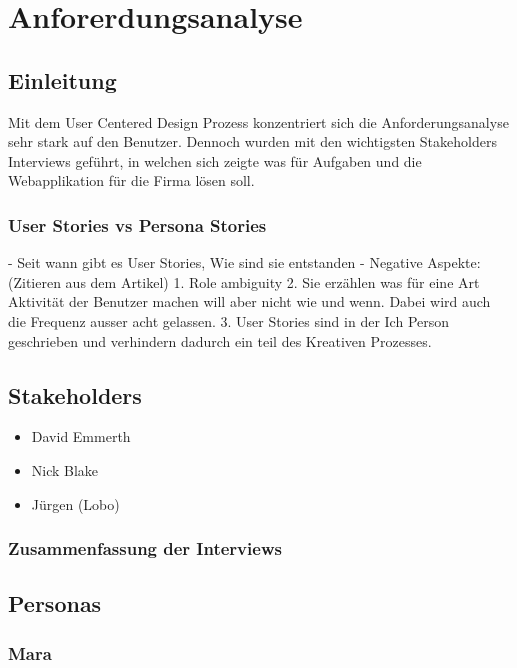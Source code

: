 \chapter{Anforerdungsanalyse}
\label{sec:anforderungsanalyse}


\section{Einleitung}
Mit dem User Centered Design Prozess konzentriert sich die Anforderungsanalyse sehr stark auf den Benutzer. Dennoch wurden mit den wichtigsten Stakeholders Interviews geführt, in welchen sich zeigte was für Aufgaben und die Webapplikation für die Firma lösen soll.


\subsection{User Stories vs Persona Stories}
- Seit wann gibt es User Stories, Wie sind sie entstanden
\newline{}
- Negative Aspekte: (Zitieren aus dem Artikel)
	1. Role ambiguity
	2. Sie erzählen was für eine Art Aktivität der Benutzer machen will aber nicht wie und wenn. Dabei wird auch die Frequenz ausser acht gelassen.
	3. User Stories sind in der Ich Person geschrieben und verhindern dadurch ein teil des Kreativen Prozesses.



\section{Stakeholders}
\begin{itemize}
	\item David Emmerth
	\item Nick Blake
	\item Jürgen (Lobo)
\end{itemize}

\subsection{Zusammenfassung der Interviews}

\section{Personas}

\subsection{Mara}

